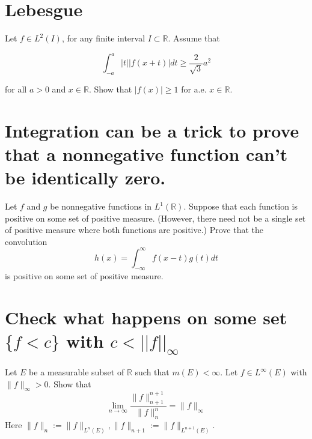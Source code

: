 \documentclass[lang=cn,11pt]{elegantbook}
\begin{document}
\section{Lebesgue}
Let $f \in L^2(I)$, for any finite interval $I \subset \mathbb{R}$. Assume that

$$
\int_{-a}^a|t||f(x+t)| d t \geq \frac{2}{\sqrt{3}} a^2
$$

for all $a>0$ and $x \in \mathbb{R}$. Show that $|f(x)| \geq 1$ for a.e. $x \in \mathbb{R}$.\newline
\newline
\newline
\newline
\newline
\newline
\newline
\newline
\newline




\section{Integration can be a trick to prove that a nonnegative function can't be identically zero.}
Let $f$ and $g$ be nonnegative functions in $L^1(\mathbb{R})$. Suppose that each function is positive on some set of positive measure. (However, there need not be a single set of positive measure where both functions are positive.) Prove that the convolution
$$
h(x)=\int_{-\infty}^{\infty} f(x-t) g(t) d t
$$
is positive on some set of positive measure.\newline
\newline
\newline
\newline
\newline
\newline
\newline
\newline
\newline





\section{Check what happens on some set $\{f<c\}$ with $c<||f||_\infty$
}
Let $E$ be a measurable subset of $\mathbb{R}$ such that $m(E)<\infty$. Let $f \in L^{\infty}(E)$ with $\|f\|_{\infty}>0$. Show that $$
\lim _{n \rightarrow \infty} \frac{\|f\|_{n+1}^{n+1}}{\|f\|_n^n}=\|f\|_{\infty}
$$
Here $\|f\|_n:=\|f\|_{L^n(E)},\|f\|_{n+1}:=\|f\|_{L^{n+1}(E)}$.\newline
\newline
\newline
\newline
\newline
\newline
\newline
\newline
\newline
\end{document}
